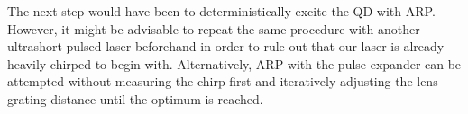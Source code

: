 The next step would have been to deterministically excite the \ac{QD} with \ac{ARP}.
However, it might be advisable to repeat the same procedure with another ultrashort pulsed laser beforehand in order to rule out that our laser is already heavily chirped to begin with.
Alternatively, \ac{ARP} with the pulse expander can be attempted without measuring the chirp first and iteratively adjusting the lens-grating distance until the optimum is reached. 
